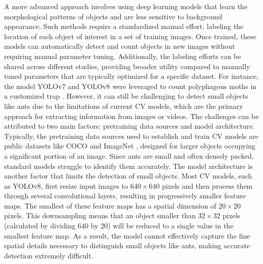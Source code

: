 A more advanced approach involves using deep learning models that learn the morphological patterns of objects and are less sensitive to background appearance. Such methods require a standardized manual effort: labeling the location of each object of interest in a set of training images. Once trained, these models can automatically detect and count objects in new images without requiring manual parameter tuning. Additionally, the labeling efforts can be shared across different studies, providing broader utility compared to manually tuned parameters that are typically optimized for a specific dataset. For instance, the model YOLOv7 \cite{wang_yolov7_2022} and YOLOv8 \cite{jocher_yolo_2023,terven_comprehensive_2023} were leveraged to count polyphagous moths in a customized trap \cite{saradopoulos_image-based_2023}. However, it can still be challenging to detect small objects like ants due to the limitations of current CV models, which are the primary approach for extracting information from images or videos. The challenges can be attributed to two main factors: pretraining data sources and model architecture. Typically, the pretraining data sources used to establish and train CV models are public datasets like COCO \cite{lin_microsoft_2015} and ImageNet \cite{deng_imagenet_2009}, designed for larger objects occupying a significant portion of an image. Since ants are small and often densely packed, standard models struggle to identify them accurately. The model architecture is another factor that limits the detection of small objects. Most CV models, such as YOLOv8, first resize input images to $640 \times 640$ pixels and then process them through several convolutional layers, resulting in progressively smaller feature maps. The smallest of these feature maps has a spatial dimension of $20 \times 20$ pixels. This downsampling means that an object smaller than $32 \times 32$ pixels (calculated by dividing 640 by 20) will be reduced to a single value in the smallest feature map. As a result, the model cannot effectively capture the fine spatial details necessary to distinguish small objects like ants, making accurate detection extremely difficult. 
    
